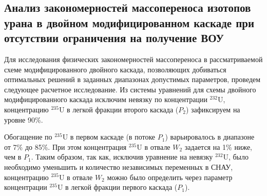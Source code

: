 \begin{enumerate}
\end{enumerate}


\subsection{Анализ закономерностей массопереноса изотопов урана в двойном модифицированном каскаде при отсутствии ограничения на получение ВОУ}


Для исследования физических закономерностей массопереноса в рассматриваемой схеме модифицированного двойного каскада, позволяющих добиваться оптимальных решений в заданных диапазонах допустимых параметров, проведем следующее расчетное исследование. Из системы уравнений для схемы двойного модифицированного каскада исключим невязку по концентрации $^{232}$U, концентрацию $^{235}$U в легкой фракции второго каскада ($P_2$) зафиксируем на уровне 90\%.

Обогащение по $^{235}$U в первом каскаде (в потоке $P_1$) варьировалось в диапазоне от 7\% до 85\%. При этом концентрация $^{235}$U в отвале $W_2$ задается на 1\% ниже, чем в $P_1$. Таким образом, так как, исключив уравнение на невязку $^{232}$U, было необходимо уменьшить и количество независимых переменных в СНАУ, концентрацию $^{235}$U в отвале $W_2$ можно было определить через параметр концентрации $^{235}$U в легкой фракции первого каскада ($P_1$).

